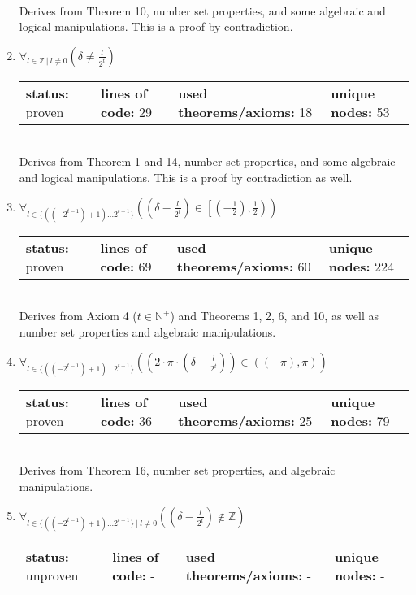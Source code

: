 \documentclass{article}[12pt]
\begin{document}
\begin{enumerate}
\begin{tabular}{l | l | l | l}
  \end{tabular} \hfill \\
Derives from Theorem 10, number set properties, and some algebraic and logical manipulations.  This is a proof by contradiction.
\item $\forall_{l \in \mathbb{Z}~|~l \neq 0} \left(\delta \neq \frac{l}{2^{t}}\right)$ \hfill \\
  \begin{tabular}{l | l | l | l}
    \textbf{status:} proven & \textbf{lines of code:} 29 & \textbf{used theorems/axioms:} 18 & \textbf{unique nodes:} 53
  \end{tabular} \hfill \\
Derives from Theorem 1 and 14, number set properties, and some algebraic and logical manipulations.  This is a proof by contradiction as well.
\item $\forall_{l \in \{\left(\left(-2^{t - 1}\right) + 1\right)\ldots 2^{t - 1}\}} \left(\left(\delta - \frac{l}{2^{t}}\right) \in \left[\left(-\frac{1}{2}\right),\frac{1}{2}\right)\right)$ \hfill \\
  \begin{tabular}{l | l | l | l}
    \textbf{status:} proven & \textbf{lines of code:} 69 & \textbf{used theorems/axioms:} 60 & \textbf{unique nodes:} 224
  \end{tabular} \hfill \\
Derives from Axiom 4 ($t \in \mathbb{N}^+$) and Theorems 1, 2, 6, and 10, as well as number set properties and algebraic manipulations. 
\item $\forall_{l \in \{\left(\left(-2^{t - 1}\right) + 1\right)\ldots 2^{t - 1}\}} \left(\left(2 \cdot \pi \cdot \left(\delta - \frac{l}{2^{t}}\right)\right) \in \left(\left(-\pi\right),\pi\right)\right)$ \hfill \\
  \begin{tabular}{l | l | l | l}
    \textbf{status:} proven & \textbf{lines of code:} 36 & \textbf{used theorems/axioms:} 25 & \textbf{unique nodes:} 79
  \end{tabular} \hfill \\
Derives from Theorem 16, number set properties, and algebraic manipulations.
\item $\forall_{l \in \{\left(\left(-2^{t - 1}\right) + 1\right)\ldots 2^{t - 1}\}~|~l \neq 0} \left(\left(\delta - \frac{l}{2^{t}}\right) \notin \mathbb{Z}\right)$ \hfill \\
  \begin{tabular}{l | l | l | l}
    \textbf{status:} unproven & \textbf{lines of code:} - & \textbf{used theorems/axioms:} - & \textbf{unique nodes:} -

\end{tabular}
\end{enumerate}
\end{document}
